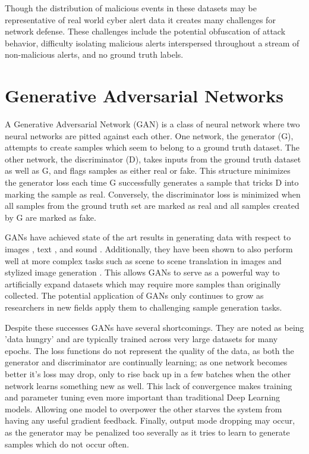 Though the distribution of malicious events in these datasets may be representative of real world cyber alert data it creates many challenges for network defense. These challenges include the potential obfuscation of attack behavior, difficulty isolating malicious alerts interspersed throughout a stream of non-malicious alerts, and no ground truth labels. 

\section{Generative Adversarial Networks}

A Generative Adversarial Network (GAN) is a class of neural network where two neural networks are pitted against each other. One network, the generator (G), attempts to create samples which seem to belong to a ground truth dataset. The other network, the discriminator (D), takes inputs from the ground truth dataset as well as G, and flags samples as either real or fake. This structure minimizes the generator loss each time G successfully generates a sample that tricks D into marking the sample as real. Conversely, the discriminator loss is minimized when all samples from the ground truth set are marked as real and all samples created by G are marked as fake.

GANs have achieved state of the art results in generating data with respect to images \cite {Karras2018, Zhu2017, Ledig2016}, text \cite{Su2018}, and sound \cite{Dong2018, Gao2018}.  Additionally, they have been shown to also perform well at more complex tasks such as scene to scene translation in images \cite{Zhu2017, Choi2017} and stylized image generation \cite{Karras2018}. This allows GANs to serve as a powerful way to artificially expand datasets which may require more samples than originally collected. The potential application of GANs only continues to grow as researchers in new fields apply them to challenging sample generation tasks.

Despite these successes GANs have several shortcomings. They are noted as being 'data hungry' and are typically trained across very large datasets for many epochs. The loss functions do not represent the quality of the data, as both the generator and discriminator are continually learning; as one network becomes better it's loss may drop, only to rise back up in a few batches when the other network learns something new as well. This lack of convergence makes training and parameter tuning even more important than traditional Deep Learning models. Allowing one model to overpower the other starves the system from having any useful gradient feedback. Finally, output mode dropping may occur, as the generator may be penalized too severally as it tries to learn to generate samples which do not occur often. 

